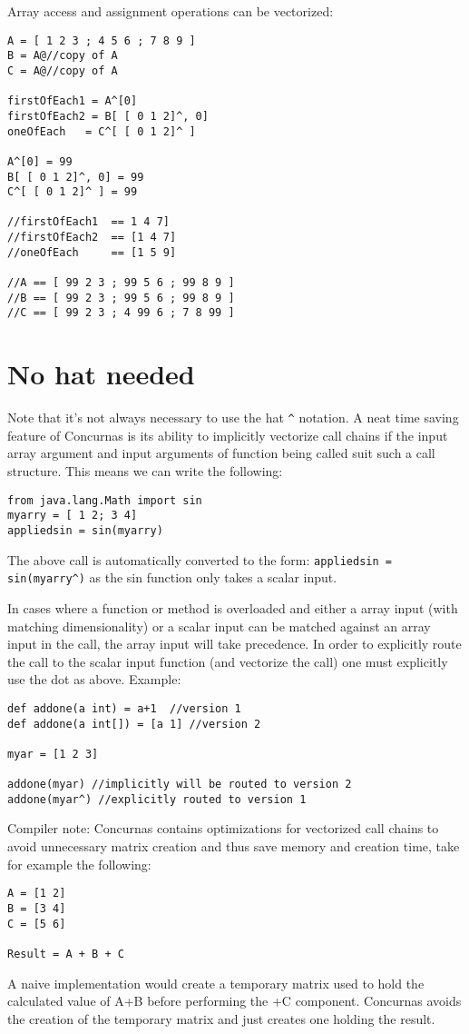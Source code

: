 \documentclass[conc-doc]{subfiles}
\begin{document}
Array access and assignment operations can be vectorized:
\begin{lstlisting}
A = [ 1 2 3 ; 4 5 6 ; 7 8 9 ]
B = A@//copy of A
C = A@//copy of A

firstOfEach1 = A^[0]
firstOfEach2 = B[ [ 0 1 2]^, 0]
oneOfEach   = C^[ [ 0 1 2]^ ]

A^[0] = 99
B[ [ 0 1 2]^, 0] = 99
C^[ [ 0 1 2]^ ] = 99

//firstOfEach1  == 1 4 7]
//firstOfEach2  == [1 4 7]
//oneOfEach 	== [1 5 9]

//A == [ 99 2 3 ; 99 5 6 ; 99 8 9 ]
//B == [ 99 2 3 ; 99 5 6 ; 99 8 9 ]
//C == [ 99 2 3 ; 4 99 6 ; 7 8 99 ]
\end{lstlisting}

\section{No hat needed}
Note that it's not always necessary to use the hat \lstinline{^} notation. A neat time saving feature of Concurnas is its ability to implicitly vectorize call chains if the input array argument and input arguments of function being called suit such a call structure. This means we can write the following:

\begin{lstlisting}
from java.lang.Math import sin
myarry = [ 1 2; 3 4]
appliedsin = sin(myarry)
\end{lstlisting}

The above call is automatically converted to the form: \lstinline{appliedsin = sin(myarry^)} as the sin function only takes a scalar input. 

In cases where a function or method is overloaded and either a array input (with matching dimensionality) or a scalar input can be matched against an array input in the call, the array input will take precedence. In order to explicitly route the call to the scalar input function (and vectorize the call) one must explicitly use the dot as above. Example:
\begin{lstlisting}
def addone(a int) = a+1  //version 1
def addone(a int[]) = [a 1] //version 2

myar = [1 2 3]

addone(myar) //implicitly will be routed to version 2
addone(myar^) //explicitly routed to version 1
\end{lstlisting}

Compiler note: Concurnas contains optimizations for vectorized call chains to avoid unnecessary matrix creation and thus save memory and creation time, take for example the following:

\begin{lstlisting}
A = [1 2]
B = [3 4]
C = [5 6]

Result = A + B + C
\end{lstlisting}

A naive implementation would create a temporary matrix used to hold the calculated value of A+B before performing the +C component. Concurnas avoids the creation of the temporary matrix and just creates one holding the result.
\end{document}
